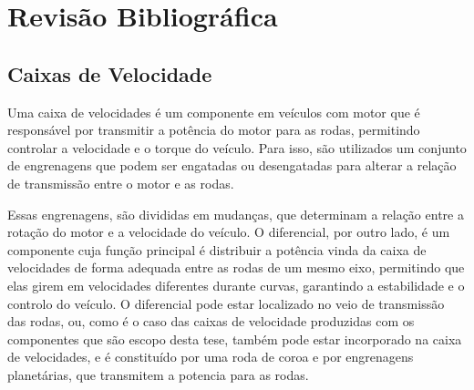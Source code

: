 \chapter{Revisão Bibliográfica} \label{ch:soa}
\setlength{\headheight}{13.6pt}
\section{Caixas de Velocidade} \label{sec:soa_caixas}
Uma caixa de velocidades é um componente em veículos com motor que é responsável por transmitir a potência do motor para as rodas, permitindo controlar a velocidade e o torque do veículo. Para isso, são utilizados um conjunto de engrenagens que podem ser engatadas ou desengatadas para alterar a relação de transmissão entre o motor e as rodas.
\par
Essas engrenagens, são divididas em mudanças, que determinam a relação entre a rotação do motor e a velocidade do veículo. O diferencial, por outro lado, é um componente cuja função principal é distribuir a potência vinda da caixa de velocidades de forma adequada entre as rodas de um mesmo eixo, permitindo que elas girem em velocidades diferentes durante curvas, garantindo a estabilidade e o controlo do veículo. O diferencial pode estar localizado no veio de transmissão das rodas, ou, como é o caso das caixas de velocidade produzidas com os componentes que são escopo desta tese, também pode estar incorporado na caixa de velocidades, e é constituído por uma roda de coroa e por engrenagens planetárias, que transmitem a potencia para as rodas.
